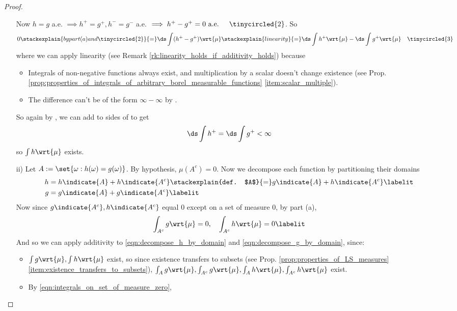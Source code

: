 \documentclass{article} %
\newcommand{\dint}{\ds\int}
\newcommand{\dmu}{\wrt{\mu}}
\begin{document}
\begin{proof}
\begin{alphabate}
\begin{enumerate}
		Now $h=g$ a.e. $\implies h^+=g^+, h^-=g^-$ a.e. $\implies h^+ - g^+ = 0 \text{ a.e. } \quad \tinycircled{2}$.   So
	\begin{align*}
	0 \stackexplain{by part (a) and \tinycircled{2}}{=} \ds\int (h^+ - g^+) \dmu \stackexplain{linearity}{=} 	\ds\int h^+ \dmu  - \ds\int g^+ \dmu && \tinycircled{3}
	\end{align*}
	where we can apply linearity (see Remark \ref{rk:linearity_holds_if_additivity_holds}) because
		\begin{itemize}
		\item Integrals of non-negative functions always exist, and multiplication by a scalar doesn't change existence (see Prop. \ref{prop:properties_of_integrals_of_arbitrary_borel_measurable_functions} \ref{item:scalar_multiple}).
		\item The difference can't be of the form $\infty - \infty$ by .
		\end{itemize}
	So again by , we can add to  sides of  to get
	\[ \dint h^+ = \dint g^+ < \infty \]
	so $\int h \dmu$ exists.
	\item[ii)] Let $A:=\set{\omega : h(\omega) = g(\omega)}$.  By hypothesis, $\mu(A^c)=0$. Now we decompose each function by partitioning their domains
	\begin{align*}
	h&=h\indicate{A} + h\indicate{A^c}  \stackexplain{def. $A$}{=} g \indicate{A} + h \indicate{A^c} \labelit \label{eqn:decompose_h_by_domain}\\
	g&= g\indicate{A} + g\indicate{A^c}  \labelit \label{eqn:decompose_g_by_domain}\\	
	\end{align*}
	 Now since $g \indicate{A^c}, h \indicate{A^c}$ equal 0 except on a set of measure 0, by part (a),
	\begin{align*}
	\int_{A^c} g \dmu =0, \quad  \int_{A^c} h \dmu =0
	\labelit\label{eqn:integrals_on_set_of_measure_zero}	
	\end{align*}
	And so we can apply additivity to \eqref{eqn:decompose_h_by_domain} and \eqref{eqn:decompose_g_by_domain}, since:
		\begin{itemize}
		\item $\int g \dmu, \int h \dmu$ exist, so since existence transfers to subsets (see Prop. \ref{prop:properties_of_LS_measures}\ref{item:existence_transfers_to_subsets}), $\int_A g \dmu, \int_{A^c} g \dmu, \int_A h \dmu, \int_{A^c} h \dmu $ exist.  
		\item By \eqref{eqn:integrals_on_set_of_measure_zero},

\end{itemize}
\end{enumerate}
\end{alphabate}
\end{proof}
\end{document}
